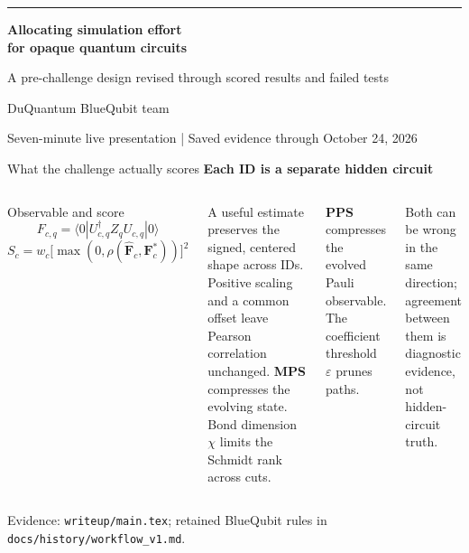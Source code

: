 \documentclass[aspectratio=169,11pt]{beamer}
\newcommand{\eyebrow}[1]{{\small\color{teal}\bfseries #1}\par\vspace{.18cm}}
\newcommand{\source}[1]{\vfill{\tiny\color{muted}Evidence: #1}}
\begin{document}
\begin{frame}[plain]
\vspace{.65cm}
{\color{teal}\rule{1.15cm}{3pt}}\par\vspace{.45cm}
{\Huge\bfseries Allocating simulation effort\\[.12cm]for opaque quantum circuits}\par\vspace{.42cm}
{\Large A pre-challenge design revised through scored results and failed tests}\par
\vspace{.75cm}
{\normalsize DuQuantum BlueQubit team}\par\vspace{.18cm}
{\small\color{muted}Seven-minute live presentation | Saved evidence through October 24, 2026}
\end{frame}

\begin{frame}{What the challenge actually scores}
\eyebrow{Each ID is a separate hidden circuit}
\begin{columns}[T,onlytextwidth]
\begin{block}{Observable and score}
\vspace{.04cm}
\[ F_{c,q}=\langle 0|U_{c,q}^{\dagger}Z_qU_{c,q}|0\rangle \]
\vspace{-.18cm}
\[ S_c=w_c\bigl[\max(0,\rho(\widehat{\mathbf F}_c,\mathbf F_c^*))\bigr]^2 \]
\vspace{-.18cm}
\end{block}
\small A useful estimate preserves the signed, centered shape across IDs. Positive scaling and a common offset leave Pearson correlation unchanged.
\vspace{.08cm}
\textbf{MPS} compresses the evolving state. Bond dimension $\chi$ limits the Schmidt rank across cuts.\par\vspace{.3cm}
\textbf{PPS} compresses the evolved Pauli observable. The coefficient threshold $\varepsilon$ prunes paths.\par\vspace{.3cm}
Both can be wrong in the same direction; agreement between them is diagnostic evidence, not hidden-circuit truth.
\end{columns}
\source{\texttt{writeup/main.tex}; retained BlueQubit rules in \texttt{docs/history/workflow\_v1.md}.}
\end{frame}
\end{document}
